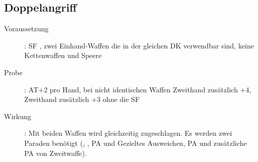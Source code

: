 \subsection{Doppelangriff}
\label{aktion.doppelangriff}
\begin{description}
    \item[Voraussetzung]:
        SF , zwei Einhand-Waffen die in der gleichen DK verwendbar sind, keine Kettenwaffen und Speere
    \item[Probe]:
        AT+2 pro Hand, bei nicht identischen Waffen Zweithand zusätzlich +4, Zweithand zusätzlich +3 ohne die SF 
    \item[Wirkung]:
        Mit beiden Waffen wird gleichzeitig zugeschlagen.
        Es werden zwei Paraden benötigt (, , PA und Gezieltes Ausweichen, PA und zusätzliche PA von Zweitwaffe).
\end{description}
